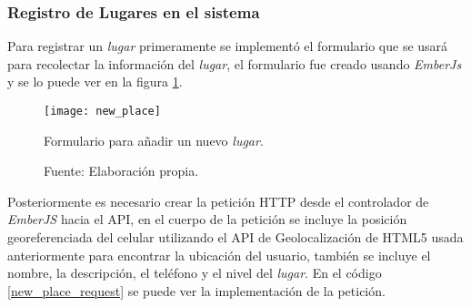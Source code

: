 
\subsubsection{Registro de Lugares en el sistema}

Para registrar un \emph{lugar} primeramente se implementó el formulario que se usará para recolectar la información del \emph{lugar}, el formulario fue creado usando \emph{EmberJs} y se lo puede ver en la figura \ref{fig:new_place}. \\

\begin{figure}[H]
     \begin{center}
       \texttt{[image: new\_place]}

       \caption{Formulario para añadir un nuevo \emph{lugar}.}
       \label{fig:new_place}
       \caption*{Fuente: Elaboración propia.}
     \end{center}
\end{figure}

Posteriormente es necesario crear la petición HTTP desde el controlador de \emph{EmberJS} hacia el API, en el cuerpo de la petición se incluye la posición georeferenciada del celular utilizando el API de Geolocalización de HTML5 usada anteriormente para encontrar la ubicación del usuario, también se incluye el nombre, la descripción, el teléfono y el nivel del \emph{lugar}. En el código \ref{new_place_request} se puede ver la implementación de la petición.




